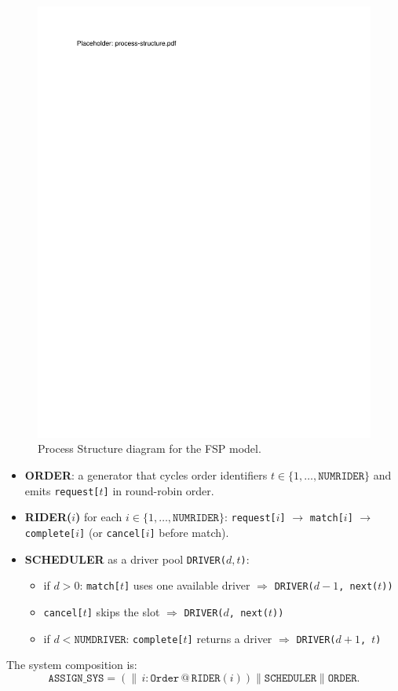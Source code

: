 \documentclass[11pt]{article}
\begin{document}
\label{sec:process-structure}
\begin{figure}[h]
  \centering
  \includegraphics[width=0.50\linewidth]{figs/process-structure.pdf}
  \caption{Process Structure diagram for the FSP model.}
\end{figure}
\begin{itemize}[leftmargin=1.5em]
  \item \textbf{ORDER}: a generator that cycles order identifiers $t \in \{1,\dots,\texttt{NUMRIDER}\}$ and emits \texttt{request[$t$]} in round-robin order.
  \item \textbf{RIDER($i$)} for each $i \in \{1,\dots,\texttt{NUMRIDER}\}$:
    \texttt{request[$i$]} $\rightarrow$ \texttt{match[$i$]} $\rightarrow$ \texttt{complete[$i$]} (or \texttt{cancel[$i$]} before match).
  \item \textbf{SCHEDULER} as a driver pool \texttt{DRIVER($d,t$)}:
    \begin{itemize}[leftmargin=1.2em]
      \item if $d>0$: \texttt{match[$t$]} uses one available driver $\Rightarrow$ \texttt{DRIVER($d{-}1$, next($t$))}
      \item \texttt{cancel[$t$]} skips the slot $\Rightarrow$ \texttt{DRIVER($d$, next($t$))}
      \item if $d<\texttt{NUMDRIVER}$: \texttt{complete[$t$]} returns a driver $\Rightarrow$ \texttt{DRIVER($d{+}1$, $t$)}
    \end{itemize}
\end{itemize}

\noindent The system composition is:
\[
\texttt{ASSIGN\_SYS} = \left(\parallel\, i:\texttt{Order}\, @\, \texttt{RIDER}(i)\right) \parallel \texttt{SCHEDULER} \parallel \texttt{ORDER}.
\]
\end{document}
